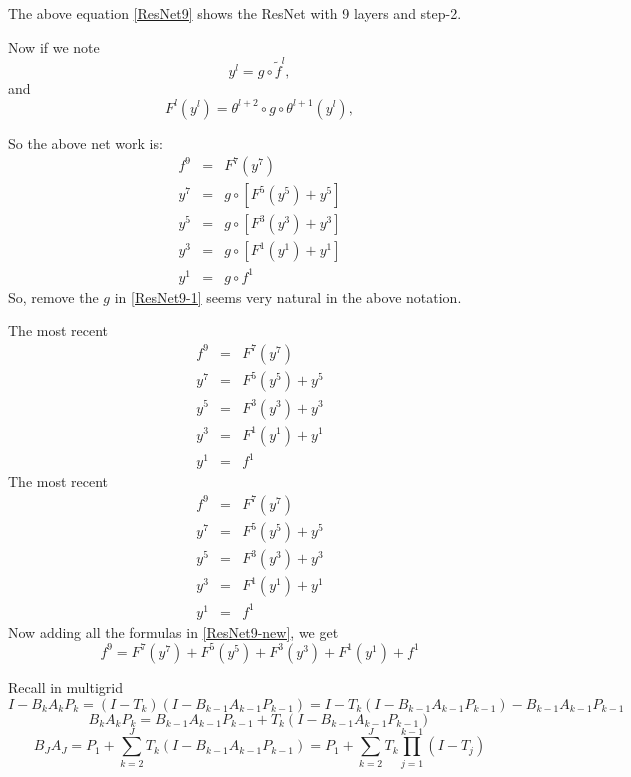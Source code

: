 \begin{enumerate}
The above equation \eqref{ResNet9} shows the ResNet with 9 layers and step-2.

Now if we note
\begin{equation}
y^l = g \circ \tilde{f}^l,
\end{equation}
and
\begin{equation}
F^l(y^l) = \theta^{l+2} \circ g \circ \theta^{l+1}(y^l),
\end{equation}

So the above net work is:
\begin{equation}\label{ResNet9-1}
  \begin{array}{rcl}
f^9 &=& F^7(y^7) \\
y^7 &=& g \circ  [ F^5(y^5) + y^5 ]\\
y^5 &=& g \circ  [F^3(y^3) + y^3 ]\\
y^3 &=& g \circ  [F^1(y^1) + y^1 ]\\
y^1 &=& g \circ f^1
  \end{array}
\end{equation}
So, remove the $g$ in \eqref{ResNet9-1} seems very natural in the
above notation.

The most recent 
\begin{equation}\label{ResNet9-1}
  \begin{array}{rcl}
f^9 &=& F^7(y^7) \\
y^7 &=& F^5(y^5) + y^5 \\
y^5 &=& F^3(y^3) + y^3 \\
y^3 &=& F^1(y^1) + y^1 \\
y^1 &=&  f^1
  \end{array}
\end{equation}
The most recent 
\begin{equation}\label{ResNet9-new}
  \begin{array}{rcl}
f^9 &=& F^7(y^7) \\
y^7 &=& F^5(y^5) + y^5 \\
y^5 &=& F^3(y^3) + y^3 \\
y^3 &=& F^1(y^1) +  y^1 \\
y^1 &=&  f^1
  \end{array}
\end{equation} 
Now adding all the formulas in \eqref{ResNet9-new}, we get
\begin{equation}\label{ResNet9-additive}
f^9 = F^7(y^7) + F^5(y^5) + F^3(y^3) +  F^1(y^1) + f^1
\end{equation}

Recall in multigrid
$$
I-B_kA_kP_k=(I-T_k)(I-B_{k-1}A_{k-1}P_{k-1})
=I-T_k(I-B_{k-1}A_{k-1}P_{k-1})-B_{k-1}A_{k-1}P_{k-1}
$$
$$
B_kA_kP_k=B_{k-1}A_{k-1}P_{k-1}
+T_k(I-B_{k-1}A_{k-1}P_{k-1}) 
$$
$$
B_JA_J=P_1+\sum_{k=2}^JT_k(I-B_{k-1}A_{k-1}P_{k-1}) 
=P_1+\sum_{k=2}^JT_k\prod_{j=1}^{k-1}(I-T_j)
$$


\end{enumerate}
